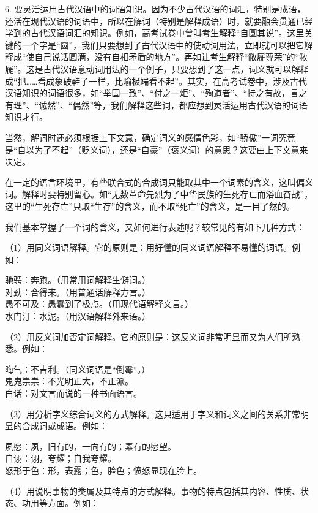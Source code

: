 6. 要灵活运用古代汉语中的词语知识。因为不少古代汉语的词汇，特别是成语，还活在现代汉语的词语中，所以在解词（特别是解释成语）时，就要融会贯通已经学到的古代汉语词汇的知识。例如，高考试卷中曾叫考生解释“自圆其说”。这里关键的一个字是“圆”，我们只要想到了古代汉语中的使动词用法，立即就可以把它解释成“使自己说话圆满，没有自相矛盾的地方”。再如让考生解释“敝屣尊荣”的“敝屣”。这是古代汉语意动词用法的一个例子，只要想到了这一点，词义就可以解释成“把……看成象破鞋子一样，比喻极端看不起”。其实，在高考试卷中，涉及古代汉语知识的词语很多，如“举国一致”、“付之一炬”、“殉道者”、“持之有故，言之有理”、“诚然”、“偶然”等，我们解释这些词，都应想到灵活运用古代汉语的词语知识才行。

当然，解词时还必须根据上下文意，确定词义的感情色彩，如“骄傲”一词究竟是“自以为了不起”（贬义词），还是“自豪”（褒义词）的意思？这要由上下文意来决定。

在一定的语言环境里，有些联合式的合成词只能取其中一个词素的含义，这叫偏义词。解释时要特别留心。如“无数革命先烈为了中华民族的生死存亡而浴血奋战”，这里的“生死存亡”只取“生存”的含义，而不取“死亡”的含义，是一目了然的。

我们基本掌握了一个词的含义，又如何进行表述呢？较常见的有如下几种方式：

（1）用同义词语解释。它的原则是：用好懂的同义词语解释不易懂的词语。例如：

驰骋：奔跑。（用常用词解释生僻词。）\\
\indent
对劲：合得来。（用普通话解释方言。）\\
\indent
愚不可及：愚蠢到了极点。（用现代语解释文言。）\\
\indent
水门汀：水泥。（用汉语解释外来语。）

（2）用反义词加否定词解释。它的原则是：这反义词非常明显而又为人们所熟悉。例如：

晦气：不吉利。（同义词语是“倒霉”。）\\
\indent
鬼鬼祟祟：不光明正大，不正派。\\
\indent
白话：对文言而说的一种书面语言。

（3）用分析字义综合词义的方式解释。这只适用于字义和词义之间的关系非常明显的合成词或成语。例如：

夙愿：夙，旧有的，一向有的；素有的愿望。\\
\indent
自诩：诩，夸耀；自我夸耀。\\
\indent
怒形于色：形，表露；色，脸色；愤怒显现在脸上。

（4）用说明事物的类属及其特点的方式解释。事物的特点包括其内容、性质、状态、功用等方面。例如：

